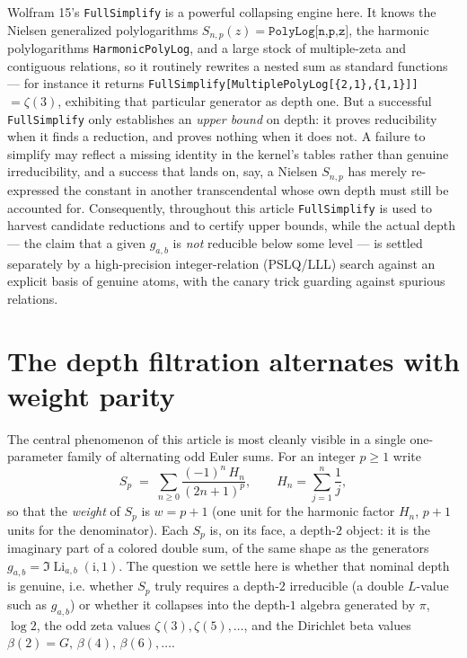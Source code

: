 \documentclass[11pt]{article}
\DeclareMathOperator{\Li}{Li}
\newcommand{\iu}{\mathrm{i}}
\theoremstyle{plain}
\theoremstyle{remark}
\begin{document}
Wolfram 15's \texttt{FullSimplify} is a powerful collapsing engine here. It knows the Nielsen generalized polylogarithms $S_{n,p}(z)=\texttt{PolyLog[n,p,z]}$, the harmonic polylogarithms \texttt{HarmonicPolyLog}, and a large stock of multiple-zeta and contiguous relations, so it routinely rewrites a nested sum as standard functions --- for instance it returns \texttt{FullSimplify[MultiplePolyLog[\{2,1\},\allowbreak\{1,1\}]]} $=\zeta(3)$, exhibiting that particular generator as depth one. But a successful \texttt{FullSimplify} only establishes an \emph{upper bound} on depth: it proves reducibility when it finds a reduction, and proves nothing when it does not. A failure to simplify may reflect a missing identity in the kernel's tables rather than genuine irreducibility, and a success that lands on, say, a Nielsen $S_{n,p}$ has merely re-expressed the constant in another transcendental whose own depth must still be accounted for. Consequently, throughout this article \texttt{FullSimplify} is used to harvest candidate reductions and to certify upper bounds, while the actual depth --- the claim that a given $g_{a,b}$ is \emph{not} reducible below some level --- is settled separately by a high-precision integer-relation (PSLQ/LLL) search against an explicit basis of genuine atoms, with the canary trick guarding against spurious relations.


\section{The depth filtration alternates with weight parity}
\label{sec:depth-alternation}

The central phenomenon of this article is most cleanly visible in a single one-parameter family of alternating odd Euler sums. For an integer $p \ge 1$ write
\[
  S_p \;=\; \sum_{n \ge 0} \frac{(-1)^n \, H_n}{(2n+1)^{p}},
  \qquad H_n = \sum_{j=1}^{n} \frac{1}{j},
\]
so that the \emph{weight} of $S_p$ is $w = p+1$ (one unit for the harmonic factor $H_n$, $p+1$ units for the denominator). Each $S_p$ is, on its face, a depth-$2$ object: it is the imaginary part of a colored double sum, of the same shape as the generators $g_{a,b} = \Im\Li_{a,b}(\iu,1)$. The question we settle here is whether that nominal depth is genuine, i.e. whether $S_p$ truly requires a depth-$2$ irreducible (a double $L$-value such as $g_{a,b}$) or whether it collapses into the depth-$1$ algebra generated by $\pi$, $\log 2$, the odd zeta values $\zeta(3),\zeta(5),\dots$, and the Dirichlet beta values $\beta(2)=G,\,\beta(4),\,\beta(6),\dots$.
\end{document}

